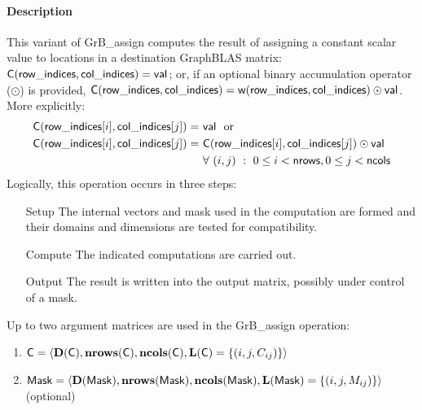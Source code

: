 \paragraph{Description}


This variant of {\sf GrB\_assign} computes the result of assigning a constant
scalar value to locations in a destination GraphBLAS matrix: 
${\sf C}({\sf row\_indices, col\_indices}) = {\sf val}$; or, if an optional 
binary accumulation operator ($\odot$) is provided, 
${\sf C}({\sf row\_indices, col\_indices}) = 
{\sf w}({\sf row\_indices, col\_indices}) \odot {\sf val}$.  
More explicitly:
\[
\begin{aligned}
	{\sf C}({\sf row\_indices}[i], {\sf col\_indices}[j]) =\ & {\sf val} \mbox{~~or~~} \\
    {\sf C}({\sf row\_indices}[i], {\sf col\_indices}[j]) =\ & 
              {\sf C}({\sf row\_indices}[i], {\sf col\_indices}[j]) \odot {\sf val} \\
    & \forall \ (i,j) \ : \ 0 \leq i < {\sf nrows},  0 \leq j < {\sf ncols}
\end{aligned}
\]  
Logically, this operation occurs in three steps:
\begin{enumerate}[leftmargin=0.75in]
\item[Setup] The internal vectors and mask used in the computation are formed 
and their domains and dimensions are tested for compatibility.
\item[Compute] The indicated computations are carried out.
\item[Output] The result is written into the output matrix, possibly under 
control of a mask.
\end{enumerate}

Up to two argument matrices are used in the {\sf GrB\_assign} operation:
\begin{enumerate}
	\item ${\sf C} = \langle \bold{D}({\sf C}),\bold{nrows}({\sf C}),
    \bold{ncols}({\sf C}),\bold{L}({\sf C}) = \{(i,j,C_{ij}) \} \rangle$
    
	\item ${\sf Mask} = \langle \bold{D}({\sf Mask}),\bold{nrows}({\sf Mask}),
    \bold{ncols}({\sf Mask}),\bold{L}({\sf Mask}) = \{(i,j,M_{ij}) \} \rangle$ (optional)
\end{enumerate}


